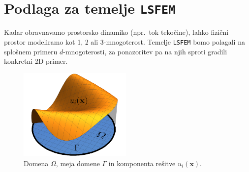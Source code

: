 \section{Podlaga za temelje \texttt{LSFEM}}

Kadar obravnavamo prostorsko dinamiko (npr.\ tok tekočine), lahko fizični prostor modeliramo kot 1, 2 ali 3-mnogoterost. Temelje \texttt{LSFEM} bomo polagali na splošnem primeru $d$-mnogoterosti, za ponazoritev pa na njih sproti gradili konkretni 2D primer.

\begin{figure}
	\vspace{-3mm}
	\centering
	\captionsetup{type=figure}
	\includegraphics[width=5.5cm]{Slike/funkcijaInDomenaG}
	\caption{Domena $\Omega$, meja domene $\Gamma$ in komponenta rešitve $u_i(\mathbf{x})$.}
\label{fig:funkInDom}
\vspace{0.2cm}
\end{figure}

